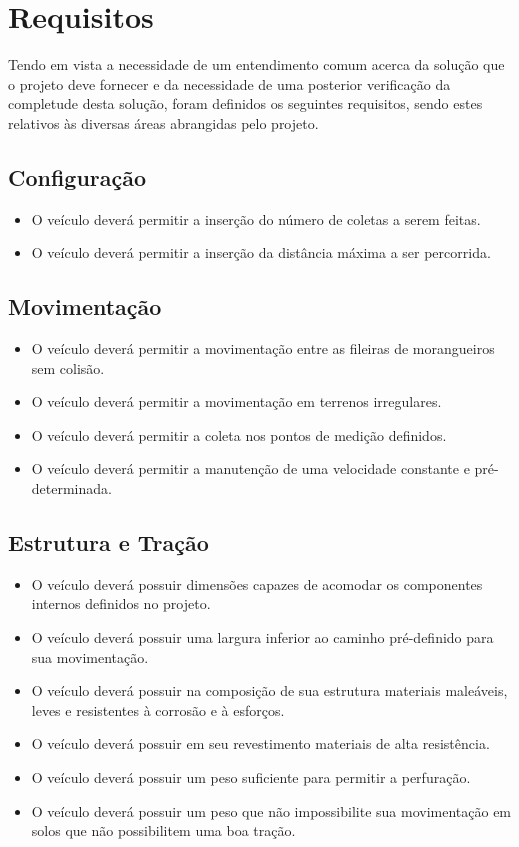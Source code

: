 \chapter{Requisitos}

  Tendo em vista a necessidade de um entendimento comum acerca da solução que o projeto deve fornecer e da necessidade de uma
  posterior verificação da completude desta solução, foram definidos os seguintes requisitos, sendo estes relativos às diversas
  áreas abrangidas pelo projeto.

  \section{Configuração}

    \begin{itemize}
      \item O veículo deverá permitir a inserção do número de coletas a serem feitas.
      \item O veículo deverá permitir a inserção da distância máxima a ser percorrida.
    \end{itemize}

  \section{Movimentação}

    \begin{itemize}
      \item O veículo deverá permitir a movimentação entre as fileiras de morangueiros sem colisão.
      \item O veículo deverá permitir a movimentação em terrenos irregulares.
      \item O veículo deverá permitir a coleta nos pontos de medição definidos.
      \item O veículo deverá permitir a manutenção de uma velocidade constante e pré-determinada.
    \end{itemize}

  \section{Estrutura e Tração}

    \begin{itemize}
      \item O veículo deverá possuir dimensões capazes de acomodar os componentes internos definidos no projeto.
      \item O veículo deverá possuir uma largura inferior ao caminho pré-definido para sua movimentação.
      \item O veículo deverá possuir na composição de sua estrutura materiais maleáveis, leves e resistentes à corrosão e à esforços.
      \item O veículo deverá possuir em seu revestimento materiais de alta resistência.
      \item O veículo deverá possuir um peso suficiente para permitir a perfuração.
      \item O veículo deverá possuir um peso que não impossibilite sua movimentação em solos que não possibilitem uma boa tração.
    \end{itemize}

